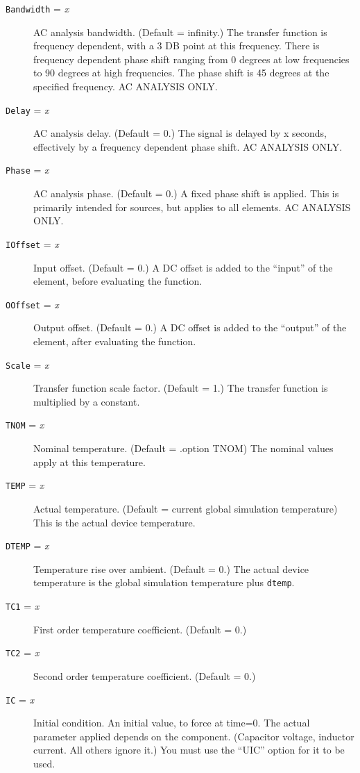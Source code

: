 \begin{description}

\item[{\tt Bandwidth} = {\it x}]
AC analysis bandwidth.  (Default = infinity.)  The transfer function
is frequency dependent, with a 3 DB point at this frequency.  There is
frequency dependent phase shift ranging from 0 degrees at low
frequencies to 90 degrees at high frequencies.  The phase shift is 45
degrees at the specified frequency.  AC ANALYSIS ONLY.

\item[{\tt Delay} = {\it x}]
AC analysis delay.  (Default = 0.) The signal is delayed by x seconds,
effectively by a frequency dependent phase shift.  AC ANALYSIS ONLY.

\item[{\tt Phase} = {\it x}]
AC analysis phase.  (Default = 0.)  A fixed phase shift is applied.
This is primarily intended for sources, but applies to all elements.
AC ANALYSIS ONLY.

\item[{\tt IOffset} = {\it x}]
Input offset.  (Default = 0.)  A DC offset is added to the ``input''
of the element, before evaluating the function.

\item[{\tt OOffset} = {\it x}]
Output offset.  (Default = 0.)  A DC offset is added to the ``output''
of the element, after evaluating the function.

\item[{\tt Scale} = {\it x}]
Transfer function scale factor.  (Default = 1.)  The transfer function
is multiplied by a constant.

\item[{\tt TNOM} = {\it x}]
Nominal temperature.  (Default = .option TNOM) The nominal values
apply at this temperature.

\item[{\tt TEMP} = {\it x}]
Actual temperature.  (Default = current global simulation temperature)
This is the actual device temperature.

\item[{\tt DTEMP} = {\it x}]
Temperature rise over ambient.  (Default = 0.)  The actual device
temperature is the global simulation temperature plus {\tt dtemp}.

\item[{\tt TC1} = {\it x}]
First order temperature coefficient.  (Default = 0.)

\item[{\tt TC2} = {\it x}]
Second order temperature coefficient.  (Default = 0.)

\item[{\tt IC} = {\it x}]
Initial condition.  An initial value, to force at time=0.  The actual
parameter applied depends on the component.  (Capacitor voltage,
inductor current.  All others ignore it.)  You must use the ``UIC''
option for it to be used.

\end{description}

